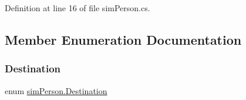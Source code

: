 Definition at line 16 of file sim\+Person.\+cs.



\subsection{Member Enumeration Documentation}
\hypertarget{classsim_person_a257596d5b7ccb0179724d7f571cd794d}{}\label{classsim_person_a257596d5b7ccb0179724d7f571cd794d} 
\subsubsection{\texorpdfstring{Destination}{Destination}}
{\footnotesize\ttfamily enum \hyperlink{classsim_person_a257596d5b7ccb0179724d7f571cd794d}{sim\+Person.\+Destination}\hspace{0.3cm}{\ttfamily [strong]}}


